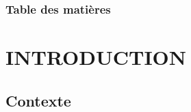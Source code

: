 \documentclass[aspectratio=169,professionalfonts, 12pt]{beamer}
\date{\today}
\begin{document}
\begin{frame}
	\titlepage
\end{frame}
\begin{frame}
	\frametitle{Table des matières}
    \begin{multicols}{2}
    \tableofcontents
    \end{multicols}
\end{frame}

\section{INTRODUCTION}

\subsection{Contexte}
\end{document}
